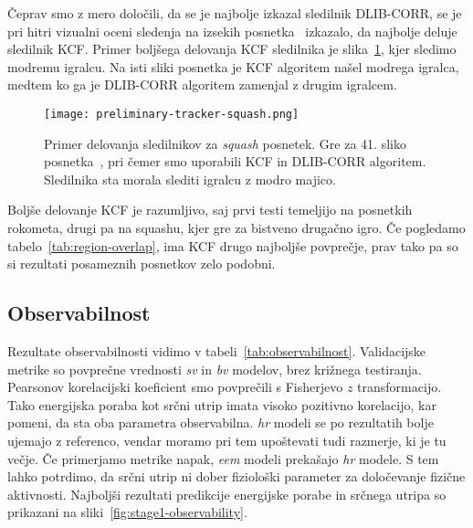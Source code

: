 Čeprav smo z mero določili, da se je najbolje izkazal sledilnik DLIB-CORR, se je pri hitri vizualni oceni sledenja na izsekih posnetka~\cite{squashtv2014squash} izkazalo, da najbolje deluje sledilnik KCF. Primer boljšega delovanja KCF sledilnika je slika~\ref{fig:squash-tracker-visual}, kjer sledimo modremu igralcu. Na isti sliki posnetka je KCF algoritem našel modrega igralca, medtem ko ga je DLIB-CORR algoritem zamenjal z drugim igralcem. 



\begin{figure}[!htbp]
	\centering
	\texttt{[image: preliminary-tracker-squash.png]}
	\caption[Primer delovanja sledilnikov za \textit{squash} posnetek]{Primer delovanja sledilnikov za \textit{squash} posnetek. Gre za 41. sliko posnetka~\cite{squashtv2014squash}, pri čemer smo uporabili KCF in DLIB-CORR algoritem. Sledilnika sta morala slediti igralcu z modro majico.}
	\label{fig:squash-tracker-visual}
\end{figure}


Boljše delovanje KCF je razumljivo, saj prvi testi temeljijo na posnetkih rokometa, drugi pa na squashu, kjer gre za bistveno drugačno igro. Če pogledamo tabelo~\ref{tab:region-overlap}, ima KCF drugo najboljše povprečje, prav tako pa so si rezultati posameznih posnetkov zelo podobni. 


















\subsection{Observabilnost}
Rezultate observabilnosti vidimo v tabeli~\ref{tab:observabilnost}. Validacijske metrike so povprečne vrednosti \textit{sv} in \textit{bv} modelov, brez križnega testiranja.  Pearsonov korelacijski koeficient smo povprečili s Fisherjevo $z$ transformacijo. Tako energijska poraba kot srčni utrip imata visoko pozitivno korelacijo, kar pomeni, da sta oba parametra observabilna. \textit{hr} modeli se po \corr rezultatih bolje ujemajo z referenco, vendar moramo pri tem upoštevati tudi \nsv razmerje, ki je tu večje. Če primerjamo metrike napak, \textit{eem} modeli prekašajo \textit{hr} modele. S tem lahko potrdimo, da srčni utrip ni dober fiziološki parameter za določevanje fizične aktivnosti. Najboljši rezultati predikcije energijske porabe in srčnega utripa so prikazani na sliki~\ref{fig:stage1-observability}.

